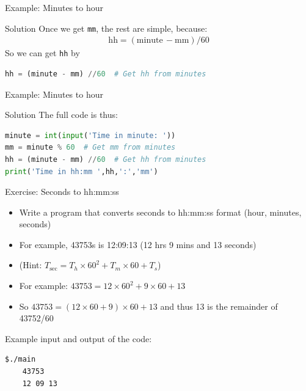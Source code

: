 \documentclass[10pt,xcolor={table,dvipsnames},t]{beamer}
\begin{document}
\begin{frame}[fragile]{Example: Minutes to hour}
  \begin{exampleblock}{Solution}
    Once we get \texttt{mm}, the rest are simple, because:
    \begin{align*}
      \text{hh} = \left(\text{minute}\,- \text{mm}\right)/60
    \end{align*}
    So we can get \texttt{hh} by
\begin{lstlisting}[language=python]
hh = (minute - mm) //60  # Get hh from minutes
\end{lstlisting}
  \end{exampleblock}
\end{frame}

\begin{frame}[fragile]{Example: Minutes to hour}
  \begin{exampleblock}{Solution}
    The full code is thus:
\begin{lstlisting}[language=python]
minute = int(input('Time in minute: '))
mm = minute % 60  # Get mm from minutes
hh = (minute - mm) //60  # Get hh from minutes
print('Time in hh:mm ',hh,':','mm')
\end{lstlisting}
  \end{exampleblock}
\end{frame}


\begin{frame}[fragile]{Exercise: Seconds to hh:mm:ss}
  \begin{itemize}
    \item Write a program that converts seconds to hh:mm:ss format (hour, minutes, seconds) 
    \item For example, 43753s is 12:09:13 (12 hrs 9 mins and 13 seconds)
    \item (Hint: $T_\text{sec} = T_{h}\times 60^2 + T_{m}\times 60 + T_{s}$)
    \item For example: $43753 = 12\times 60^2 + 9\times 60 + 13$
    \item So $43753 = (12\times 60 + 9)\times 60 + 13$ and thus 13 is the remainder of 43752/60
  \end{itemize}
  \vspace{1mm}
  Example input and output of the code:
\begin{lstlisting}[language=bash]
    $./main
    43753
    12 09 13
\end{lstlisting}
\end{frame}
\end{document}
